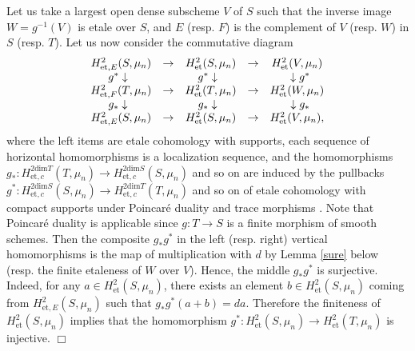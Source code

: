 \documentclass[11pt]{amsart}
\begin{document}
{{Let us take a largest open dense subscheme $V$ of $S$ such that 
the inverse image $W = g^{-1}(V)$ is etale over $S$, and 
$E$ (resp. $F$) is the complement of $V$ (resp. $W$) in $S$ (resp. $T$). 
Let us now consider the commutative diagram 
$$
\begin{array}{ccccc}
H_{\mathrm{et}, E}^2(S, \mu_n) &\rightarrow &H_{\mathrm{et}}^2(S, \mu_n)
&\rightarrow &H_{\mathrm{et}}^2(V, \mu_n) \\
g^\ast\downarrow\hspace*{2mm} & &g^\ast\downarrow\hspace*{2mm}  & &\hspace*{2mm} \downarrow g^\ast \\
H_{\mathrm{et}, F}^2(T, \mu_n) &\rightarrow &H_{\mathrm{et}}^2(T, \mu_n)
&\rightarrow &H_{\mathrm{et}}^2(W, \mu_n) \\
g_\ast\downarrow\hspace*{2mm} & &g_\ast\downarrow\hspace*{2mm}  & &\hspace*{2mm} \downarrow g_\ast \\
H_{\mathrm{et}, E}^2(S, \mu_n) &\rightarrow &H_{\mathrm{et}}^2(S, \mu_n)
&\rightarrow &H_{\mathrm{et}}^2(V, \mu_n), 
\end{array}
$$
where the left items are etale cohomology with supports, each sequence of horizontal homomorphisms 
is a localization sequence, and the homomorphisms $g_\ast : H_{\mathrm{et}, c}^{2\mathrm{dim}T}(T, \mu_n) 
\rightarrow H_{\mathrm{et}, c}^{2\mathrm{dim}S}(S, \mu_n)$ and so on are induced by 
the pullbacks 
$g^\ast : H_{\mathrm{et}, c}^{2\mathrm{dim}S}(S, \mu_n) \rightarrow H_{\mathrm{et}, c}^{2\mathrm{dim}T}(T, \mu_n)$ and so on 
of etale cohomology with compact supports under Poincar\'e duality 
and trace morphisms \cite[VI, Remark 11.6]{mil}. 
Note that Poincar\'e duality is applicable since $g : T \rightarrow S$ is a finite morphism of smooth schemes. 
Then the composite $g_\ast g^\ast$ in the left (resp. right) vertical homomorphisms 
is the map of multiplication with $d$ by Lemma \ref{sure} below (resp. 
the finite etaleness of $W$ over $V$). 
Hence, the middle $g_\ast g^\ast$ is surjective. Indeed, for any $a \in H_{\mathrm{et}}^2(S, \mu_n)$, there exists 
an element $b \in H_{\mathrm{et}}^2(S, \mu_n)$ coming from $H_{\mathrm{et}, E}^2(S, \mu_n)$ 
such that $g_\ast g^\ast(a + b) = da$. Therefore the finiteness of $H^2_{\mathrm{et}}(S, \mu_n)$ 
implies that 
the homomorphism $g^\ast : H^2_{\mathrm{et}}(S, \mu_n) \rightarrow H^2_{\mathrm{et}}(T, \mu_n)$ 
is injective.
} \hspace*{\fill} $\Box$}
\end{document}
